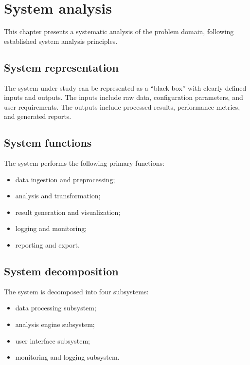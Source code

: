 \section{System analysis}

This chapter presents a systematic analysis of the problem domain, following established system analysis principles.

\subsection{System representation}

The system under study can be represented as a ``black box'' with clearly defined inputs and outputs.
The inputs include raw data, configuration parameters, and user requirements.
The outputs include processed results, performance metrics, and generated reports.

\subsection{System functions}

The system performs the following primary functions:
\begin{itemize}
  \item data ingestion and preprocessing;
  \item analysis and transformation;
  \item result generation and visualization;
  \item logging and monitoring;
  \item reporting and export.
\end{itemize}

\subsection{System decomposition}

The system is decomposed into four subsystems:
\begin{itemize}
  \item data processing subsystem;
  \item analysis engine subsystem;
  \item user interface subsystem;
  \item monitoring and logging subsystem.
\end{itemize}

